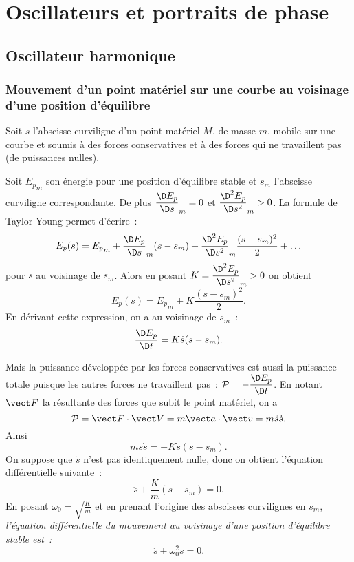 \chapter{Oscillateurs et portraits de phase}
\label{chap:oscillateursetportraitdephase}
\minitoc
\minilof
\minilot

\section{Oscillateur harmonique}
\label{chap5-sec:oscillateur}

\subsection{Mouvement d'un point matériel sur une courbe au voisinage d'une position d'équilibre}
\label{chap5-subsec:mvtauvoisinagedunepositiondequilibre}

Soit $s$ l'abscisse curviligne d'un point matériel $M$, de masse $m$, mobile sur une courbe et soumis à des forces conservatives et à des forces qui ne travaillent pas (de puissances nulles).

Soit ${E_{p}}_m$ son énergie pour une position d'équilibre stable et $s_m$ l'abscisse curviligne correspondante. De plus $\derived{E_p}{s}_m=0$ et $\deriveds{E_p}{s}_m>0$. La formule de Taylor-Young permet d'écrire~:
\begin{equation}
  E_p(s) = {E_p}_m + \derived{E_p}{s}_m (s-s_m) + \deriveds{E_p}{s}_m \frac{(s-s_m)^2}{2} + \ldots
\end{equation}
pour $s$ au voisinage de $s_m$. Alors en posant $K=\deriveds{E_p}{s}_m>0$ on obtient
\begin{equation}
  E_p(s) = {E_p}_m + K \frac{(s-s_m)^2}{2}.
\end{equation}
En dérivant cette expression, on a au voisinage de $s_m$~:
\begin{equation}
  \derived{E_p}{t} = K \dot{s} (s-s_m).
\end{equation}

Mais la puissance développée par les forces conservatives est aussi la puissance totale puisque les autres forces ne travaillent pas~: $\P=-\derived{E_p}{t}$. En notant $\vF$ la résultante des forces que subit le point matériel, on a
\begin{equation}
  \P = \vF \cdot \vV = m\va \cdot \vv = m\ddot{s} \dot{s}.
\end{equation}
Ainsi
\begin{equation}
  m\ddot{s}\dot{s} = -K \dot{s}(s-s_m).
\end{equation}
On suppose que $\dot{s}$ n'est pas identiquement nulle, donc on obtient l'équation différentielle suivante~:
\begin{equation}
  \ddot{s} + \frac{K}{m}(s-s_m) = 0.
\end{equation}
En posant $\omega_0 = \sqrt{\frac{K}{m}}$ et en prenant l'origine des abscisses curvilignes en $s_m$, \emph{l'équation différentielle du mouvement au voisinage d'une position d'équilibre stable est~:}
\begin{equation}
  \ddot{s} + \omega_0^2 s = 0.
\end{equation}

